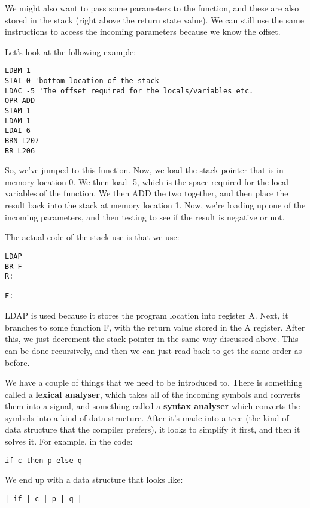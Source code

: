 \documentclass[11pt,a4paper,titlepage,dvipsnames,cmyk]{scrartcl}
\begin{document}
We might also want to pass some parameters to the function, and these are
also stored in the stack (right above the return state value). We can
still use the same instructions to access the incoming parameters because
we know the offset.

Let's look at the following example:
\begin{lstlisting}[style=B]
LDBM 1
STAI 0 'bottom location of the stack
LDAC -5 'The offset required for the locals/variables etc.
OPR ADD
STAM 1
LDAM 1
LDAI 6
BRN L207
BR L206
\end{lstlisting}

So, we've jumped to this function. Now, we load the stack pointer that is
in memory location 0. We then load -5, which is the space required for
the local variables of the function. We then ADD the two together, and
then place the result back into the stack at memory location 1. Now, we're
loading up one of the incoming parameters, and then testing to see if
the result is negative or not.

The actual code of the stack use is that we use:
\begin{lstlisting}[style=B]
LDAP
BR F
R:

F:
\end{lstlisting}

LDAP is used because it stores the program location into register A. Next,
it branches to some function F, with the return value stored in the A
register. After this, we just decrement the stack pointer in the same way
discussed above. This can be done recursively, and then we can just read
back to get the same order as before.

We have a couple of things that we need to be introduced to. There is
something called a \textbf{lexical analyser}, which takes all of the
incoming symbols and converts them into a signal, and something called a
\textbf{syntax analyser}  which converts the symbols into a kind of data
structure. After it's made into a tree (the kind of data structure that
the compiler prefers), it looks to simplify it first, and then it solves
it. For example, in the code:

\begin{lstlisting}[style=B]
if c then p else q
\end{lstlisting}

We end up with a data structure that looks like:

\begin{lstlisting}[style=B]
| if | c | p | q |
\end{lstlisting}
\end{document}
